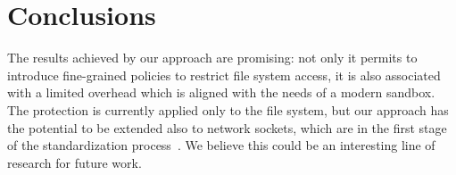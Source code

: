 \section{Conclusions}
\label{sect:wasm:conclusions}

The results achieved by our approach are promising: not only it
permits to introduce fine-grained policies to restrict file system
access, it is also associated with a limited overhead which is aligned
with the needs of a modern sandbox. The protection is currently
applied only to the file system, but our approach has the potential to
be extended also to network sockets, which are in the first stage of
the standardization process~\cite{wasi-sockets}. We believe this
could be an interesting line of research for future work.

